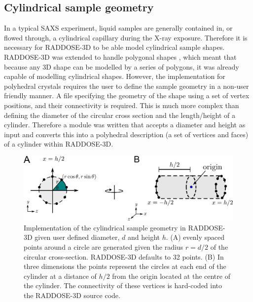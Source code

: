 \subsection{Cylindrical sample geometry}
\label{sub:Cylindrical sample geometry}
In a typical SAXS experiment, liquid samples are generally contained in, or flowed through, a cylindrical capillary during the X-ray exposure.
Therefore it is necessary for RADDOSE-3D to be able model cylindrical sample shapes.
RADDOSE-3D was extended to handle polygonal shapes \cite{bury2015radiation}, which meant that because any 3D shape can be modelled by a series of polygons, it was already capable of modelling cylindrical shapes.
However, the implementation for polyhedral crystals requires the user to define the sample geometry in a non-user friendly manner.
A file specifying the geometry of the shape using a set of vertex positions, and their connectivity is required.
This is much more complex than defining the diameter of the circular cross section and the length/height of a cylinder.
Therefore a module was written that accepts a diameter and height as input and converts this into a polyhedral description (a set of vertices and faces) of a cylinder within RADDOSE-3D.
\begin{figure}
    \centering
    \includegraphics[width=1\textwidth]{figures/saxs/cylinder_implementation.pdf}
    \caption[Implementation of the cylindrical sample geometry in RADDOSE-3D.]{Implementation of the cylindrical sample geometry in RADDOSE-3D given user defined diameter, $d$ and height $h$. (A) evenly spaced points around a circle are generated given the radius $r = d/2$ of the circular cross-section. RADDOSE-3D defaults to 32 points. (B) In three dimensions the points represent the circles at each end of the cylinder at a distance of $h/2$ from the origin located at the centre of the cylinder. The connectivity of these vertices is hard-coded into the RADDOSE-3D source code.}
    \label{fig:Cylindrical implementation}
\end{figure}


